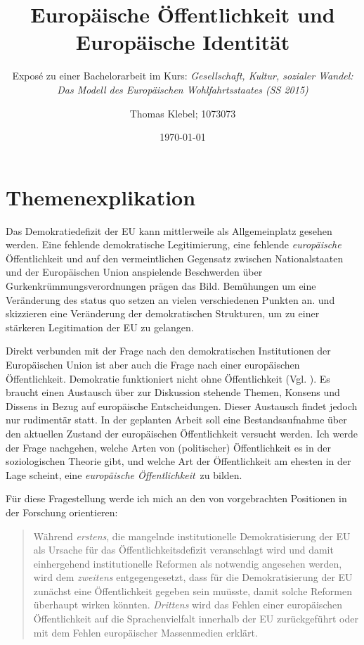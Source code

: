 \documentclass[a4paper, german, oneside]{scrartcl}
\date{\displaydate{date}}
\title{Europäische Öffentlichkeit und Europäische Identität}
\subtitle{Exposé zu einer Bachelorarbeit im Kurs: \emph{Gesellschaft, Kultur, sozialer Wandel: Das Modell des Europäischen Wohlfahrtsstaates (SS 2015)}}
\date{\today}
\author{Thomas Klebel; 1073073}
\newcommand{\citet}[1]{\textcite{#1}}
\begin{document}
\maketitle

\section{Themenexplikation}
Das Demokratiedefizit der EU kann mittlerweile als Allgemeinplatz gesehen werden. Eine fehlende demokratische Legitimierung, eine fehlende \emph{europäische} Öffentlichkeit und auf den vermeintlichen Gegensatz zwischen Nationalstaaten und der Europäischen Union anspielende Beschwerden über Gurkenkrümmungsverordnungen prägen das Bild. Bemühungen um eine Veränderung des status quo setzen an vielen verschiedenen Punkten an. \citet{grozelier_democracy_2013_habermas} und \citet{grozelier_europes_2013_hill} skizzieren eine Veränderung der demokratischen Strukturen, um zu einer stärkeren Legitimation der EU zu gelangen.

Direkt verbunden mit der Frage nach den demokratischen Institutionen der Europäischen Union ist aber auch die Frage nach einer europäischen Öffentlichkeit. Demokratie funktioniert nicht ohne Öffentlichkeit (Vgl. \textcite[32]{schildberg_politische_2010}). Es braucht einen Austausch über zur Diskussion stehende Themen, Konsens und Dissens in Bezug auf europäische Entscheidungen. Dieser Austausch findet jedoch nur rudimentär statt. In der geplanten Arbeit soll eine Bestandsaufnahme über den aktuellen Zustand der europäischen Öffentlichkeit versucht werden. Ich werde der Frage nachgehen, welche Arten von (politischer) Öffentlichkeit es in der soziologischen Theorie gibt, und welche Art der Öffentlichkeit am ehesten in der Lage scheint, eine \emph{europäische Öffentlichkeit} zu bilden.

Für diese Fragestellung werde ich mich an den von \citet{schildberg_politische_2010} vorgebrachten Positionen in der Forschung orientieren: \blockquote[{\cite[32]{schildberg_politische_2010}}]{Während \emph{erstens}, die mangelnde institutionelle Demokratisierung der EU als Ursache für das Öffentlichkeitsdefizit veranschlagt wird und damit einhergehend institutionelle Reformen als notwendig angesehen werden, wird dem \emph{zweitens} entgegengesetzt, dass für die Demokratisierung der EU zunächst eine Öffentlichkeit gegeben sein muüsste, damit solche Reformen überhaupt wirken könnten. \emph{Drittens} wird das Fehlen einer europäischen Öffentlichkeit auf die Sprachenvielfalt innerhalb der EU zurückgeführt oder mit dem Fehlen europäischer Massenmedien erklärt.}
\end{document}
